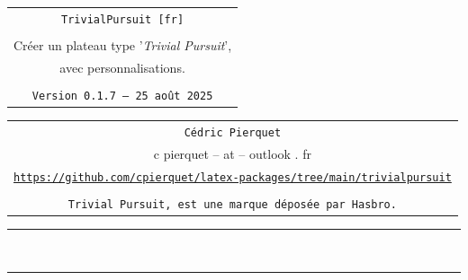 \documentclass[11pt,a4paper]{ltxdoc}
\def\TPversion{0.1.7}
\def\TPdate{25 août 2025}
\begin{document}
\pagestyle{fancy}

\thispagestyle{empty}

\begin{center}
	\begin{minipage}{0.88\linewidth}
	\begin{tcolorbox}[colframe=yellow,colback=yellow!15]
		\begin{center}
			\begin{tabular}{c}
				{\Huge \texttt{TrivialPursuit [fr]}}\\
				\\
				{\LARGE Créer un plateau type '\textit{Trivial Pursuit}',} \\
				{\LARGE avec personnalisations.} \\
				\\
				{\small \texttt{Version \TPversion{} -- \TPdate}}
		\end{tabular}
		\end{center}
	\end{tcolorbox}
\end{minipage}
\end{center}

\begin{center}
	\begin{tabular}{c}
	\texttt{Cédric Pierquet}\\
	{\ttfamily c pierquet -- at -- outlook . fr}\\
	\texttt{\url{https://github.com/cpierquet/latex-packages/tree/main/trivialpursuit}} \\
	\\
	\texttt{Trivial Pursuit\texttrademark, est une marque déposée par Hasbro.}
\end{tabular}
\end{center}

\hrule

\vfill

\begin{tcolorbox}[colframe=lightgray,colback=lightgray!5]
\PlateauTrivialPursuit
\end{tcolorbox}

\vfill~

\pagebreak


\hypertarget{matoc}{}

\tableofcontents

\vspace*{5mm}

\hrule
\end{document}
